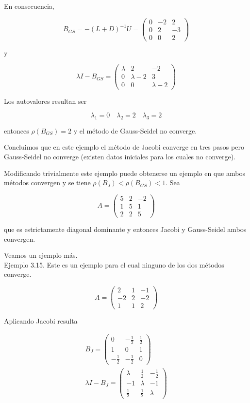 \documentclass[10pt]{article}
\begin{document}
En consecuencia,

$$
B_{G S}=-(L+D)^{-1} U=\left(\begin{array}{ccc}
0 & -2 & 2 \\
0 & 2 & -3 \\
0 & 0 & 2
\end{array}\right)
$$

y

$$
\lambda I-B_{G S}=\left(\begin{array}{ccc}
\lambda & 2 & -2 \\
0 & \lambda-2 & 3 \\
0 & 0 & \lambda-2
\end{array}\right)
$$

Los autovalores resultan ser

$$
\lambda_{1}=0 \quad \lambda_{2}=2 \quad \lambda_{3}=2
$$

entonces $\rho\left(B_{G S}\right)=2$ y el método de Gauss-Seidel no converge.

Concluimos que en este ejemplo el método de Jacobi converge en tres pasos pero Gauss-Seidel no converge (existen datos iniciales para los cuales no converge).

Modificando trivialmente este ejemplo puede obtenerse un ejemplo en que ambos métodos convergen y se tiene $\rho\left(B_{J}\right)<\rho\left(B_{G S}\right)<1$. Sea

$$
A=\left(\begin{array}{ccc}
5 & 2 & -2 \\
1 & 5 & 1 \\
2 & 2 & 5
\end{array}\right)
$$

que es estrictamente diagonal dominante y entonces Jacobi y Gauss-Seidel ambos convergen.

Veamos un ejemplo más.\\
Ejemplo 3.15. Este es un ejemplo para el cual ninguno de los dos métodos converge.

$$
A=\left(\begin{array}{ccc}
2 & 1 & -1 \\
-2 & 2 & -2 \\
1 & 1 & 2
\end{array}\right)
$$

Aplicando Jacobi resulta

$$
\begin{gathered}
B_{J}=\left(\begin{array}{ccc}
0 & -\frac{1}{2} & \frac{1}{2} \\
1 & 0 & 1 \\
-\frac{1}{2} & -\frac{1}{2} & 0
\end{array}\right) \\
\lambda I-B_{J}=\left(\begin{array}{ccc}
\lambda & \frac{1}{2} & -\frac{1}{2} \\
-1 & \lambda & -1 \\
\frac{1}{2} & \frac{1}{2} & \lambda
\end{array}\right)
\end{gathered}
$$
\end{document}
